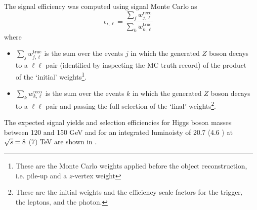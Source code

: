 The signal efficiency was computed using signal Monte Carlo as
\[
    \epsilon_{i,\ell} = \frac{\sum_j w^{\text{reco}}_{j,\ell}}{\sum_k w^{\text{true}}_{k,\ell}}
\]
where
\begin{itemize}
 \item $\sum_j w^{\text{true}}_{j,\ell}$ is the sum over the events $j$ in which the
 generated $Z$ boson decays to a $\ell\ell$ pair (identified by inspecting the
 MC truth record) of the product of the `initial' weights\footnote{These are
 the Monte Carlo weights applied before the object reconstruction, i.e. pile-up
 and a $z$-vertex weight}.
 \item $\sum_k w^{\text{reco}}_{k,\ell}$ is the sum over the events $k$ in which
 the generated $Z$ boson decays to a $\ell\ell$ pair and passing the full \HTollg
 selection of the `final' weights\footnote{These are the initial weights and the 
 efficiency scale factors for the trigger, the leptons, and the photon.}.
\end{itemize}
The expected signal yields and selection efficiencies for Higgs boson masses 
between 120 and 150 GeV and for an integrated luminoisty of 20.7 \ifb (4.6 \ifb)
at $\sqrt{s} = 8$ (7) TeV are shown in .

